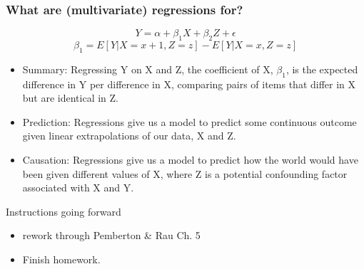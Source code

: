 \documentclass[aspectratio=169, handout]{beamer}
\numberwithin{equation}{section}
\begin{document}
\begin{frame}
\frametitle{What are (multivariate) regressions for?}
$$Y= \alpha+\beta_1X+ \beta_2 Z+\epsilon$$
$$\beta_1 = E[Y|X = x+1, Z =z] - E[Y|X = x, Z =z] $$
\begin{itemize}
\item Summary: Regressing Y on X and Z, the coefficient of X, $\beta_1$, is the expected difference in Y per difference in X, comparing pairs of items that differ in X but are identical in Z.\pause
\item Prediction: Regressions give us a model to predict some continuous outcome given linear extrapolations of our data, X and Z.\pause
\item Causation: Regressions give us a model to predict how the world would have been given different values of X, where Z is a potential confounding factor associated with X and Y.
\end{itemize}

\end{frame}


\begin{frame}{Instructions going forward}
\begin{itemize}
\item rework through Pemberton \& Rau Ch. 5
\item Finish homework.
\end{itemize}
\end{frame}
\end{document}
